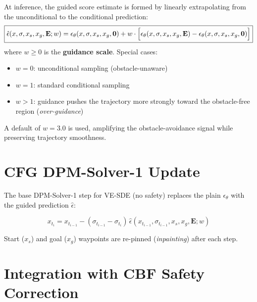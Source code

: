 \documentclass{article}
\begin{document}
At inference, the guided score estimate is formed by linearly extrapolating from the
unconditional to the conditional prediction:
\begin{equation}
\boxed{
    \hat{\epsilon}(x, \sigma, x_s, x_g, \mathbf{E}; w)
    = \epsilon_\theta(x, \sigma, x_s, x_g, \mathbf{0})
      + w \cdot \Bigl[
          \epsilon_\theta(x, \sigma, x_s, x_g, \mathbf{E})
          - \epsilon_\theta(x, \sigma, x_s, x_g, \mathbf{0})
        \Bigr]
}
\end{equation}
where $w \geq 0$ is the \textbf{guidance scale}. Special cases:
\begin{itemize}
    \item $w = 0$: unconditional sampling (obstacle-unaware)
    \item $w = 1$: standard conditional sampling
    \item $w > 1$: guidance pushes the trajectory more strongly toward the
          obstacle-free region (\emph{over-guidance})
\end{itemize}
A default of $w = 3.0$ is used, amplifying the obstacle-avoidance signal
while preserving trajectory smoothness.

\section{CFG DPM-Solver-1 Update}

The base DPM-Solver-1 step for VE-SDE (no safety) replaces the plain
$\epsilon_\theta$ with the guided prediction $\hat\epsilon$:

\begin{equation}
    x_{t_i} = x_{t_{i-1}} - (\sigma_{t_{i-1}} - \sigma_{t_i})\,
              \hat{\epsilon}(x_{t_{i-1}}, \sigma_{t_{i-1}}, x_s, x_g, \mathbf{E}; w)
\end{equation}

Start ($x_s$) and goal ($x_g$) waypoints are re-pinned (\emph{inpainting})
after each step.

\section{Integration with CBF Safety Correction}
\end{document}
